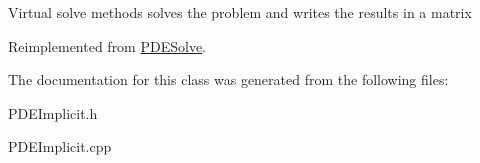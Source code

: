 Virtual solve methods solves the problem and writes the results in a matrix 

Reimplemented from \hyperlink{class_p_d_e_solve_a2fb309c3e7f35de2f639596f7fcb17cc}{P\+D\+E\+Solve}.



The documentation for this class was generated from the following files\+:\begin{DoxyCompactItemize}
\item 
P\+D\+E\+Implicit.\+h\item 
P\+D\+E\+Implicit.\+cpp\end{DoxyCompactItemize}
